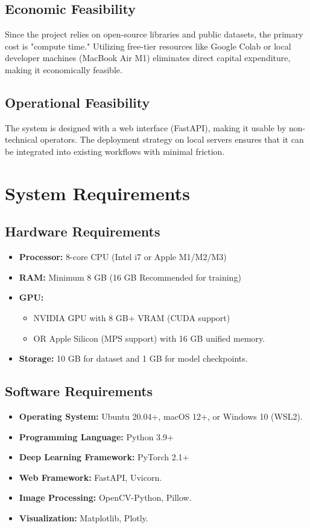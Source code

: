 \documentclass[12pt,a4paper]{report}
\begin{document}
\subsection{Economic Feasibility}
Since the project relies on open-source libraries and public datasets, the primary cost is "compute time." Utilizing free-tier resources like Google Colab or local developer machines (MacBook Air M1) eliminates direct capital expenditure, making it economically feasible.

\subsection{Operational Feasibility}
The system is designed with a web interface (FastAPI), making it usable by non-technical operators. The deployment strategy on local servers ensures that it can be integrated into existing workflows with minimal friction.

\section{System Requirements}

\subsection{Hardware Requirements}
\begin{itemize}
    \item \textbf{Processor:} 8-core CPU (Intel i7 or Apple M1/M2/M3)
    \item \textbf{RAM:} Minimum 8 GB (16 GB Recommended for training)
    \item \textbf{GPU:} 
        \begin{itemize}
            \item NVIDIA GPU with 8 GB+ VRAM (CUDA support) 
            \item OR Apple Silicon (MPS support) with 16 GB unified memory.
        \end{itemize}
    \item \textbf{Storage:} 10 GB for dataset and 1 GB for model checkpoints.
\end{itemize}

\subsection{Software Requirements}
\begin{itemize}
    \item \textbf{Operating System:} Ubuntu 20.04+, macOS 12+, or Windows 10 (WSL2).
    \item \textbf{Programming Language:} Python 3.9+
    \item \textbf{Deep Learning Framework:} PyTorch 2.1+
    \item \textbf{Web Framework:} FastAPI, Uvicorn.
    \item \textbf{Image Processing:} OpenCV-Python, Pillow.
    \item \textbf{Visualization:} Matplotlib, Plotly.
\end{itemize}
\end{document}
